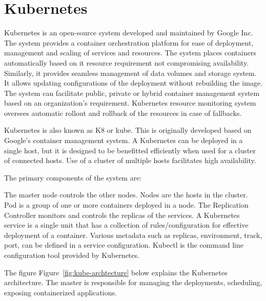 \section{Kubernetes}
Kubernetes is an open-source system developed and maintained by Google Inc.
 The system provides a container orchestration platform for ease of deployment,
 management and scaling of services and resources. The system places containers
 automatically based on it resource requirement not compromising availability.
  Similarly, it provides seamless management of data volumes and storage 
  system.
  It allows updating configurations of the deployment without rebuilding the
   image. The system can facilitate public, private or hybrid container 
   management system based on an organization's requirement.  Kubernetes 
   resource monitoring system oversees automatic rollout and rollback of the 
   resources in case of fallbacks.


Kubernetes is also known as K8 or kube. This is originally developed based on 
Google's container management system. A Kubernetes can be deployed in a single 
host, but it is designed to be benefitted efficiently when used for a cluster 
of connected hosts. Use of a cluster of multiple hosts facilitates high 
availability.


The primary components of the system are: 

The master node controls the other nodes. Nodes are the hosts in the cluster. 
Pod is a group of one or more containers deployed in a node.  The Replication
 Controller monitors and controls the replicas of the services. A Kubernetes 
 service is a single unit that has a collection of rules/configuration for 
 effective deployment of a container. Various metadata such as replicas, 
 environment, track, port, can be defined in a service configuration. 
 Kubectl is the command line configuration tool provided by Kubernetes. 

The figure Figure~\ref{fig:kube-archtecture} below explains the Kubernetes 
architecture. The master is responsible for managing the deployments, 
scheduling, exposing containerized applications.

